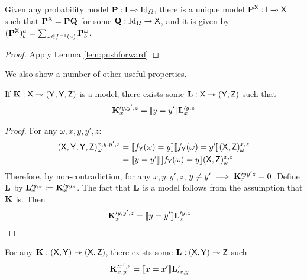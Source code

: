 \begin{corollary}\label{corr:pushforward}
Given any probability model $\mathbf{P}:\mathsf{I}\rightarrowtriangle \text{Id}_\Omega$, there is a unique model $\mathbf{P}^{\mathsf{X}}:\mathsf{I}\rightarrowtriangle \mathsf{X}$ such that $\mathbf{P}^{\mathsf{X}}=\mathbf{P}\mathbf{Q}$ for some $\mathbf{Q}:\text{Id}_\Omega\to \mathsf{X}$, and it is given by $(\mathbf{P}^{\mathsf{X}})^a_b = \sum_{\omega\in f^{-1}(a)} \mathbf{P}_b^{\omega}$.
\end{corollary}

\begin{proof}
Apply Lemma \ref{lem:pushforward}
\end{proof}

We also show a number of other useful properties. 

\begin{lemma}\label{lem:nocopy1}
If $\mathbf{K}:\mathsf{X}\rightarrowtriangle (\mathsf{Y},\mathsf{Y},\mathsf{Z})$ is a model, there exists some $\mathbf{L}:\mathsf{X}\rightarrowtriangle (\mathsf{Y},\mathsf{Z})$ such that
\begin{align}
		\mathbf{K}_{x}^{\prime y,y',z} &= \llbracket y=y' \rrbracket\mathbf{L}_{x}^{\prime y,z}\\
\end{align}
\end{lemma}

\begin{proof}
For any $\omega,x,y,y',z$:
\begin{align}
	(\mathsf{X},\mathsf{Y},\mathsf{Y},\mathsf{Z})_\omega^{x,y,y',z} &= \llbracket f_{\mathsf{Y}}(\omega)=y \rrbracket \llbracket f_{\mathsf{Y}}(\omega)=y' \rrbracket (\mathsf{X},\mathsf{Z})_\omega^{x,z} \\
	&= \llbracket y=y' \rrbracket \llbracket f_{\mathsf{Y}}(\omega)=y \rrbracket(\mathsf{X},\mathsf{Z})_\omega^{x,z}
\end{align}
Therefore, by non-contradiction, for any $x,y,y',z$, $y\neq y'\implies \mathbf{K}_{x}^{\prime yy'z}=0$. Define $\mathbf{L}$ by $\mathbf{L}_x^{\prime y, z} := \mathbf{K}_x^{\prime y y z}$. The fact that $\mathbf{L}$ is a model follows from the assumption that $\mathbf{K}$ is. Then
\begin{align}
	\mathbf{K}_{x}^{\prime y,y',z} &= \llbracket y=y' \rrbracket\mathbf{L}_{x}^{\prime y,z}
\end{align}
\end{proof}


\begin{lemma}\label{lem:nocopy2}
For any $\mathbf{K}:(\mathsf{X},\mathsf{Y})\rightarrowtriangle (\mathsf{X},\mathsf{Z})$, there exists some $\mathbf{L}:(\mathsf{X},\mathsf{Y})\rightarrowtriangle \mathsf{Z}$ such
\begin{align}
	 \mathbf{K}_{x,y}^{\prime x',z} &= \llbracket x=x'\rrbracket \mathbf{L}_{\prime x,y}^{z}
\end{align}
\end{lemma}

